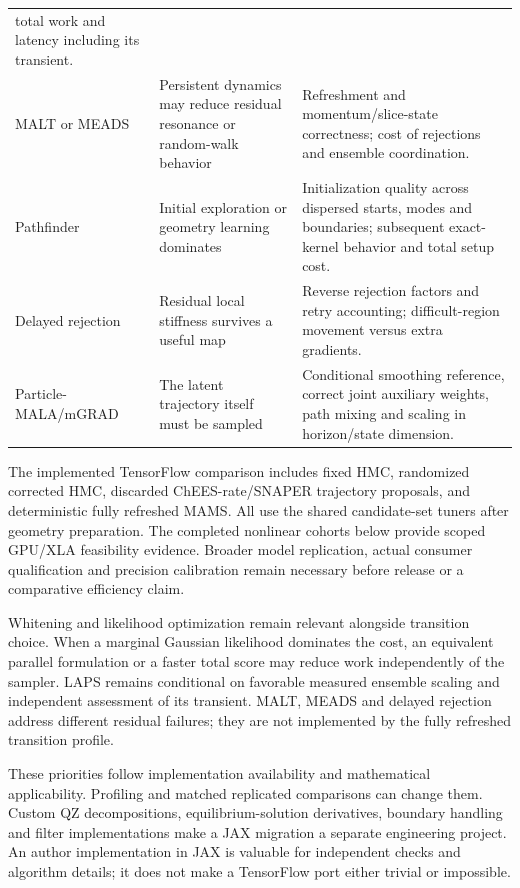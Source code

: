 \begin{longtable}{>{\raggedright\arraybackslash}p{}
>{\raggedright\arraybackslash}p{}
>{\raggedright\arraybackslash}p{}}
total work and latency including its transient.\\
MALT or MEADS &
Persistent dynamics may reduce residual resonance or random-walk behavior &
Refreshment and momentum/slice-state correctness; cost of rejections and
ensemble coordination.\\
Pathfinder &
Initial exploration or geometry learning dominates &
Initialization quality across dispersed starts, modes and boundaries;
subsequent exact-kernel behavior and total setup cost.\\
Delayed rejection &
Residual local stiffness survives a useful map &
Reverse rejection factors and retry accounting; difficult-region movement
versus extra gradients.\\
Particle-MALA/mGRAD &
The latent trajectory itself must be sampled &
Conditional smoothing reference, correct joint auxiliary weights, path
mixing and scaling in horizon/state dimension.\\
\end{longtable}

The implemented TensorFlow comparison includes fixed HMC,
randomized corrected HMC, discarded ChEES-rate/SNAPER trajectory proposals,
and deterministic fully refreshed MAMS. All use the shared candidate-set
tuners after geometry preparation. The completed nonlinear cohorts below
provide scoped GPU/XLA feasibility evidence. Broader model replication,
actual consumer qualification and precision calibration remain necessary
before release or a comparative efficiency claim.

Whitening and likelihood optimization remain relevant alongside transition
choice. When a marginal Gaussian likelihood dominates the cost, an equivalent
parallel formulation or a faster total score may reduce work independently
of the sampler. LAPS remains conditional on favorable measured ensemble
scaling and independent assessment of its transient. MALT, MEADS and delayed
rejection address different residual failures; they are not implemented by
the fully refreshed transition profile.

These priorities follow implementation availability and mathematical
applicability. Profiling and matched replicated comparisons can change them.
Custom QZ decompositions, equilibrium-solution derivatives, boundary
handling and filter implementations make a JAX migration a separate
engineering project. An author implementation in JAX is valuable for
independent checks and algorithm details; it does not make a TensorFlow
port either trivial or impossible.

